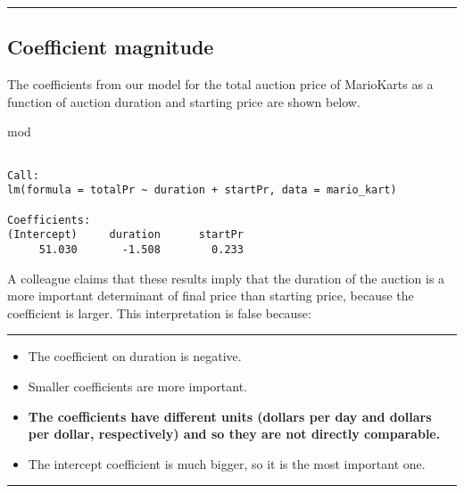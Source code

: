 \documentclass[]{book}
\newenvironment{Shaded}{\begin{snugshade}}{\end{snugshade}}
\newcommand{\NormalTok}[1]{#1}
\begin{document}
\hypertarget{htmlwidget-7a63ded58c7f2591b816}{}

\begin{center}\rule{0.5\linewidth}{\linethickness}\end{center}

\subsection*{Coefficient magnitude}\label{coefficient-magnitude}

The coefficients from our model for the total auction price of
MarioKarts as a function of auction duration and starting price are
shown below.

\begin{Shaded}
\begin{Highlighting}[]
\NormalTok{mod}
\end{Highlighting}
\end{Shaded}

\begin{verbatim}

Call:
lm(formula = totalPr ~ duration + startPr, data = mario_kart)

Coefficients:
(Intercept)     duration      startPr  
     51.030       -1.508        0.233  
\end{verbatim}

A colleague claims that these results imply that the duration of the
auction is a more important determinant of final price than starting
price, because the coefficient is larger. This interpretation is false
because:

\begin{center}\rule{0.5\linewidth}{\linethickness}\end{center}

\begin{itemize}
\item
  The coefficient on duration is negative.
\item
  Smaller coefficients are more important.
\item
  \textbf{The coefficients have different units (dollars per day and
  dollars per dollar, respectively) and so they are not directly
  comparable.}
\item
  The intercept coefficient is much bigger, so it is the most important
  one.
\end{itemize}

\begin{center}\rule{0.5\linewidth}{\linethickness}\end{center}
\end{document}
